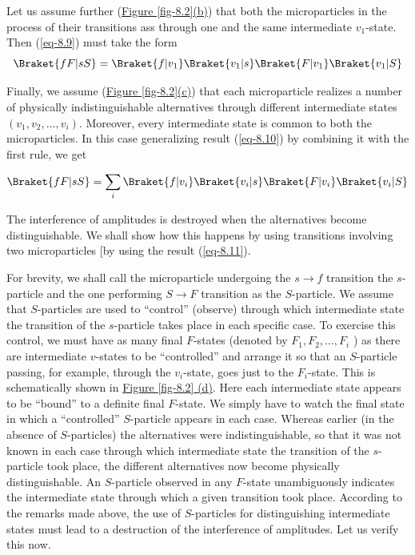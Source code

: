 \documentclass[a4paper,sfsidenotes,colorlinks=true]{tufte-book}
\numberwithin{equation}{section}
\numberwithin{figure}{section}
\begin{document}
Let us assume further (\hyperref[fig-8.2]{Figure \ref{fig-8.2}(b)}) that both the microparticles in the process of their transitions ass through one and the same intermediate $v_{1}$-state. Then (\ref{eq-8.9}) must take the form
\begin{equation}%
\Braket{fF |sS} =  \Braket{f|v_{1}} \Braket{v_{1}|s} \Braket{F|v_{1}} \Braket{v_{1}|S}
\label{eq-8.10} 
\end{equation}

Finally, we assume (\hyperref[fig-8.2]{Figure \ref{fig-8.2}(c)}) that
each microparticle realizes a number of physically indistinguishable
alternatives through different intermediate states $(v_{1}, v_{2} ,
\ldots, v_{i})$. Moreover, every intermediate state is common to both
the microparticles. In this case generalizing result (\ref{eq-8.10}) by
combining it with the first rule, we get

\begin{equation}%
\Braket{fF |sS} =  \sum_{i} \Braket{f|v_{i}} \Braket{v_{i}|s} \Braket{F|v_{i}} \Braket{v_{i}|S}
\label{eq-8.11} 
\end{equation}

The interference  of amplitudes is destroyed when the alternatives
become distinguishable. We shall show how this happens by using
transitions involving two microparticles [by using the result (\ref{eq-8.11}).


For brevity, we shall call the microparticle undergoing the $s \to f$
transition the $s$-particle and the one performing $S \to F$
transition as the $S$-particle. We assume that $S$-particles are used
to ``control'' (observe) through which intermediate state the
transition of the $s$-particle takes place in each specific case. To
exercise this control, we must have as many final $F$-states (denoted
by $F_{1}, F_{2}, \ldots, F_{i}$ ) as there are intermediate
$v$-states to be ``controlled'' and arrange it so that an $S$-particle
passing, for example, through the $v_{i}$-state, goes just to the
$F_{i}$-state. This is schematically shown in
\hyperref[fig-8.2]{Figure \ref{fig-8.2} (d)}. Here each intermediate
state appears to be ``bound'' to a definite final $F$-state. We simply
have to watch the final state in which a ``controlled'' $S$-particle
appears in each case. Whereas earlier (in the absence of $S$-particles)
the alternatives were indistinguishable, so that it was not known in
each case through which intermediate state the transition of the
$s$-particle took place, the different alternatives now become
physically distinguishable. An $S$-particle observed in any $F$-state 
unambiguously indicates the intermediate state through which a given
transition took place. According to the remarks made above, the use of
$S$-particles for distinguishing intermediate states must lead to a
destruction of the interference of amplitudes.  Let us verify this
now.
\end{document}

